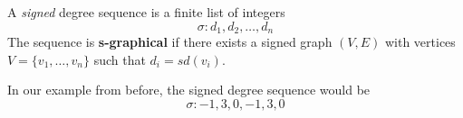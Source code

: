 \begin{frame}
    \begin{definition}
        A \textit{signed} degree sequence is a finite list of integers
        \begin{equation*}
            \sigma : d_1, d_2, \dots, d_n
        \end{equation*}
        The sequence is \textbf{s-graphical} if there exists a signed graph $(V,E)$ with vertices $V = \{v_1,\dots,v_n\}$ such that $d_i = sd(v_i)$.
    \end{definition}
    In our example from before, the signed degree sequence would be
    \begin{equation*}
        \sigma : -1, 3, 0, -1, 3, 0
    \end{equation*}
\end{frame}
